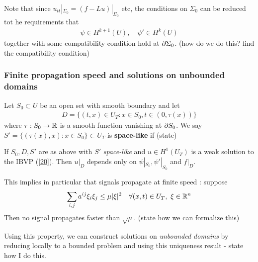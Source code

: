 \documentclass[10pt,a4paper]{report}
\begin{document}
Note that since $u_{tt}|_{\Sigma_0} = (f-Lu)|_{\Sigma_0}$ etc, the conditions on $\Sigma_0$ can be reduced tot he requirements that
\begin{align*}
\psi \in H^{k+1}(U), \quad \psi' \in H^k(U)
\end{align*}
together with some compatibility condition hold at $\partial \Sigma_0$. (how do we do this? find the compatibility condition)
\s

\subsubsection*{Finite propagation speed and solutions on unbounded domains}

\quad Let $S_0 \subset U$ be an open set with smooth boundary and let
\begin{align*}
D = \{ (t,x) \in U_T : x\in S_0, t\in (0, \tau(x)) \}
\end{align*}
where $\tau : S_0 \rightarrow \mathbb{R}$ is a smooth function vanishing at $\partial S_0$. We say $S' = \{ (\tau(x), x) : x\in S_0 \} \subset U_T$ is \textbf{space-like} if (state)
\s

\thm If $S_0, D, S'$ are as above with $S'$ \emph{space-like} and $u\in H^1(U_T)$ is a weak solution to the IBVP (\ref{20}). Then $u|_D$ depends only on $\psi|_{S_0}, \psi'|_{S_0}$ and $f|_D$. 
\s

This implies in particular that signals propagate at finite speed : suppose
\begin{align*}
\sum_{i,j} a^{ij} \xi_i \xi_j \leq \mu |\xi|^2 \quad \forall (x,t) \in U_T, \,\, \xi \in \mathbb{R}^n
\end{align*}
Then no signal propagates faster than $\sqrt{\mu}$. (state how we can formalize this)

Using this property, we can construct solutions on \emph{unbounded domains} by reducing locally to a bounded problem and using this uniqueness result - state how I do this.
\end{document}
